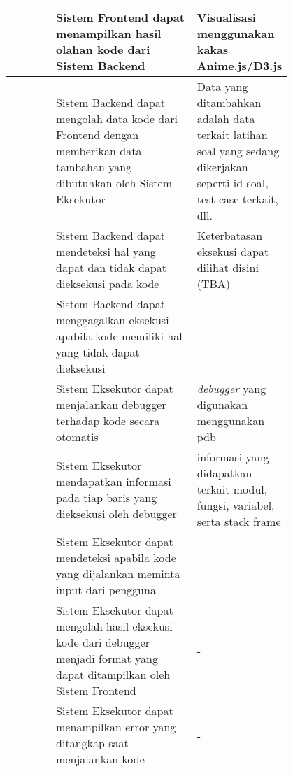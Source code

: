 \begin{longtable}[c]{|l|>{\setlength{\baselineskip}{0.75\baselineskip}}p{0.5\linewidth}|>{\setlength{\baselineskip}{0.75\baselineskip}}p{0.3\linewidth}|}
              & Sistem Frontend dapat menampilkan hasil olahan kode dari Sistem Backend                                                      & Visualisasi menggunakan kakas Anime.js/D3.js                                                                           \\ \hline
              & Sistem Backend dapat mengolah data kode dari Frontend dengan memberikan data tambahan yang dibutuhkan oleh Sistem Eksekutor  & Data yang ditambahkan adalah data terkait latihan soal yang sedang dikerjakan seperti id soal, test case terkait, dll. \\ \hline
              & Sistem Backend dapat mendeteksi hal yang dapat dan tidak dapat dieksekusi pada kode                                          & Keterbatasan eksekusi dapat dilihat disini (TBA)                                                                       \\ \hline
              & Sistem Backend dapat menggagalkan eksekusi apabila kode memiliki hal yang tidak dapat dieksekusi                             & -                                                                                                                      \\ \hline
              & Sistem Eksekutor dapat menjalankan debugger terhadap kode secara otomatis                                                    & \textit{debugger} yang digunakan menggunakan pdb                                                                       \\ \hline
              & Sistem Eksekutor mendapatkan informasi pada tiap baris yang dieksekusi oleh debugger                                         & informasi yang didapatkan terkait modul, fungsi, variabel, serta stack frame                                           \\ \hline
              & Sistem Eksekutor dapat mendeteksi apabila kode yang dijalankan meminta input dari pengguna                                   & -                                                                                                                      \\ \hline
              & Sistem Eksekutor dapat mengolah hasil eksekusi kode dari debugger menjadi format yang dapat ditampilkan oleh Sistem Frontend & -                                                                                                                      \\ \hline
              & Sistem Eksekutor dapat menampilkan error yang ditangkap saat menjalankan kode                                                & -                                                                                                                      \\ \hline

\end{longtable}
